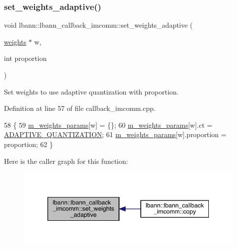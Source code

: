 \subsubsection{\texorpdfstring{set\+\_\+weights\+\_\+adaptive()}{set\_weights\_adaptive()}}
{\footnotesize\ttfamily void lbann\+::lbann\+\_\+callback\+\_\+imcomm\+::set\+\_\+weights\+\_\+adaptive (\begin{DoxyParamCaption}\item[{\hyperlink{classlbann_1_1weights}{weights} $\ast$}]{w,  }\item[{int}]{proportion }\end{DoxyParamCaption})}

Set weights to use adaptive quantization with proportion. 

Definition at line 57 of file callback\+\_\+imcomm.\+cpp.


\begin{DoxyCode}
58                                                                  \{
59   \hyperlink{classlbann_1_1lbann__callback__imcomm_a32a0319c91aff324cb3468de4f31dd50}{m\_weights\_params}[w] = \{\};
60   \hyperlink{classlbann_1_1lbann__callback__imcomm_a32a0319c91aff324cb3468de4f31dd50}{m\_weights\_params}[w].ct = \hyperlink{classlbann_1_1lbann__callback__imcomm_acf7e894b3381e7f9b71020dc73594d6aaeb95973ab89fc579b91554cd783031b7}{ADAPTIVE\_QUANTIZATION};
61   \hyperlink{classlbann_1_1lbann__callback__imcomm_a32a0319c91aff324cb3468de4f31dd50}{m\_weights\_params}[w].proportion = proportion;
62 \}
\end{DoxyCode}
Here is the caller graph for this function\+:\nopagebreak
\begin{figure}[H]
\begin{center}
\leavevmode
\includegraphics[width=346pt]{classlbann_1_1lbann__callback__imcomm_a5e0f7d9f85da8d2e579dbe4092bc3100_icgraph}
\end{center}
\end{figure}
\mbox{\label{classlbann_1_1lbann__callback__imcomm_a6ad492f30a34de2ac62fe459037e1d12}} 
